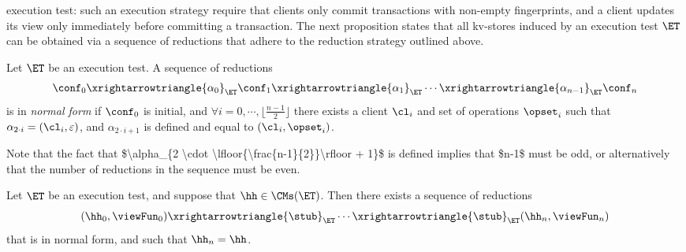 execution test: such an execution strategy require that clients only commit transactions with non-empty fingerprints, 
and a client updates its view only immediately before committing a transaction. 
The next proposition states that all kv-stores induced by an execution test $\ET$ can be 
obtained via a sequence of reductions that adhere to the reduction strategy outlined above. 
\begin{definition}
Let $\ET$ be an execution test. A sequence of reductions 
\[
\conf_0 \xrightarrowtriangle{\alpha_0}_{\ET} \conf_1 \xrightarrowtriangle{\alpha_1}_{\ET} \cdots \xrightarrowtriangle{\alpha_{n-1}}_{\ET} \conf_{n}
\]
is in \emph{normal form} if $\conf_0$ is initial, and 
$\forall i=0,\cdots, \lfloor\frac{n-1}{2} \rfloor$ there exists a client $\cl_i$ and set of operations $\opset_{i}$ such that 
$\alpha_{2 \cdot i} = (\cl_{i}, \varepsilon)$, and $\alpha_{2 \cdot i + 1}$ is defined and equal to $(\cl_{i}, \opset_{i})$.
\end{definition}


\ac{Note that the fact that $\alpha_{2 \cdot \lfloor{\frac{n-1}{2}}\rfloor + 1}$ is defined implies that $n-1$ must be odd, or alternatively that 
the number of reductions in the sequence must be even.}

\begin{proposition}
\label{prop:et.normalform}
Let $\ET$ be an execution test, and suppose that $\hh \in \CMs(\ET)$. Then there exists a sequence of 
reductions 
\[
(\hh_0, \viewFun_0) \xrightarrowtriangle{\stub}_{\ET} \cdots \xrightarrowtriangle{\stub}_{\ET} (\hh_n, \viewFun_{n})
\]
that is in normal form, and such that $\hh_{n} = \hh$.
\end{proposition}

